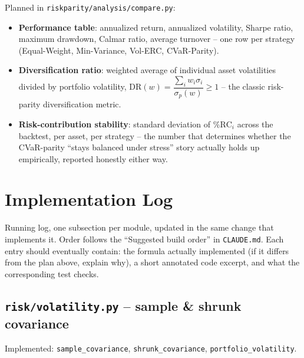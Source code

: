 \documentclass[11pt]{article}
\begin{document}
Planned in \texttt{riskparity/analysis/compare.py}:
\begin{itemize}
    \item \textbf{Performance table}: annualized return, annualized
    volatility, Sharpe ratio, maximum drawdown, Calmar ratio, average
    turnover -- one row per strategy (Equal-Weight, Min-Variance,
    Vol-ERC, CVaR-Parity).
    \item \textbf{Diversification ratio}: weighted average of individual
    asset volatilities divided by portfolio volatility,
    $\text{DR}(w) = \dfrac{\sum_i w_i \sigma_i}{\sigma_p(w)} \geq 1$ --
    the classic risk-parity diversification metric.
    \item \textbf{Risk-contribution stability}: standard deviation of
    $\%\text{RC}_i$ across the backtest, per asset, per strategy -- the
    number that determines whether the CVaR-parity ``stays balanced under
    stress'' story actually holds up empirically, reported honestly
    either way.
\end{itemize}

\section{Implementation Log}
\label{sec:impl-log}

Running log, one subsection per module, updated in the same change that
implements it. Order follows the ``Suggested build order'' in
\texttt{CLAUDE.md}. Each entry should eventually contain: the formula
actually implemented (if it differs from the plan above, explain why),
a short annotated code excerpt, and what the corresponding test checks.

\subsection{\texttt{risk/volatility.py} -- sample \& shrunk covariance}

Implemented: \texttt{sample\_covariance}, \texttt{shrunk\_covariance},
\texttt{portfolio\_volatility}.
\end{document}
